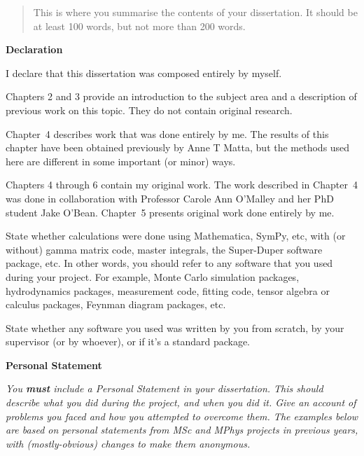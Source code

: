 \documentclass[12pt,a4paper]{report}
\begin{document}
\newpage



\begin{abstract}
This is where you summarise the contents of your dissertation. It should be
at least 100 words, but not more than 200 words.
\end{abstract}


\begin{center}
\textbf{Declaration}
\end{center}

I declare that this dissertation was composed entirely by myself.

Chapters 2 and 3 provide an introduction to the subject area and a
description of previous work on this topic. They do not contain
original research.

Chapter~4 describes work that was done entirely by me. The results of
this chapter have been obtained previously by Anne T Matta, but the
methods used here are different in some important (or minor) ways.

Chapters 4 through 6 contain my original work. The work described in
Chapter~4 was done in collaboration with Professor Carole Ann O'Malley
and her PhD student Jake O'Bean. Chapter~5 presents original work done
entirely by me.

\bigskip

State whether calculations were done using Mathematica, SymPy, etc,
with (or without) gamma matrix code, master integrals, the Super-Duper
software package, etc. In other words, you should refer to any
software that you used during your project. For example, Monte Carlo
simulation packages, hydrodynamics packages, measurement code, fitting
code, tensor algebra or calculus packages, Feynman diagram packages,
etc.

State whether any software you used was written by you from scratch,
by your supervisor (or by whoever), or if it's a standard package.

\newpage

\begin{center}
\textbf{Personal Statement}
\end{center}

\emph{You \textbf{\emph{must}} include a Personal Statement in your
  dissertation. This should describe what you did during the project,
  and when you did it. Give an account of problems you faced and how
  you attempted to overcome them. The examples below are based on
  personal statements from MSc and MPhys projects in previous years,
  with (mostly-obvious) changes to make them anonymous. }
\end{document}
